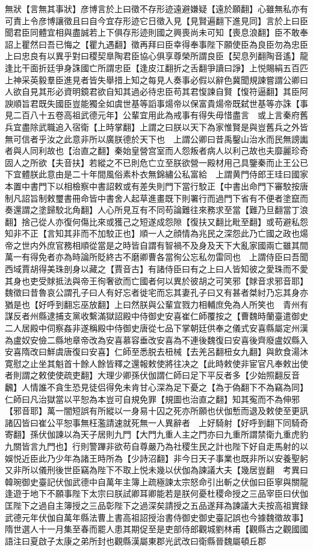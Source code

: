 無狀【言無其事狀】彦博言於上曰徵不存形迹遠避嫌疑【遠於願翻】心雖無私亦有可責上令彦博讓徵且曰自今宜存形迹它日徵入見【見賢遍翻下進見同】言於上曰臣聞君臣同體宜相與盡誠若上下俱存形迹則國之興喪尚未可知【喪息浪翻】臣不敢奉詔上瞿然曰吾已悔之【瞿九遇翻】徵再拜曰臣幸得奉事陛下願使臣為良臣勿為忠臣上曰忠良有以異乎對曰稷契臯陶君臣協心俱享尊榮所謂良臣【契息列翻陶音遙】龍逢比干面折廷爭身誅國亡所謂忠臣【逢皮江翻折之舌翻爭讀曰諍】上悦賜絹五百匹上神采英毅羣臣進見者皆失舉措上知之每見人奏事必假以辭色冀聞規諫嘗謂公卿曰人欲自見其形必資明鏡君欲自知其過必待忠臣苟其君愎諫自賢【愎符逼翻】其臣阿諛順旨君既失國臣豈能獨全如虞世基等謟事煬帝以保富貴煬帝既弑世基等亦誅【事見二百八十五卷高祖武德元年】公輩宜用此為戒事有得失毋惜盡言　或上言秦府舊兵宜盡除武職追入宿衛【上時掌翻】上謂之曰朕以天下為家惟賢是與豈舊兵之外皆無可信者乎汝之此意非所以廣朕德於天下也　上謂公卿曰昔禹鑿山治水而民無謗讟者與人同利故也【治直之翻】秦始皇營宫室而人怨叛者病人以利己故也夫靡麗珍奇固人之所欲【夫音扶】若縱之不已則危亡立至朕欲營一殿材用己具鑒秦而止王公已下宜體朕此意由是二十年間風俗素朴衣無錦繡公私富給　上謂黄門侍郎王珪曰國家本置中書門下以相檢察中書詔敕或有差失則門下當行駮正【中書出命門下審駮按唐制凡詔旨制敕璽書冊命皆中書舍人起草進畫既下則署行而過門下省有不便者塗竄而奏還謂之塗歸駮北角翻】人心所見互有不同苟論難往來務求至當【難乃旦翻當丁浪翻】捨己從人亦復何傷比來或獲己之短遂成怨隙【復扶又翻比毗至翻】或苟避私怨知非不正【言知其非而不加駮正也】順一人之顔情為兆民之深怨此乃亡國之政也煬帝之世内外庶官務相順從當是之時皆自謂有智禍不及身及天下大亂家國兩亡雖其間萬一有得免者亦為時論所貶終古不磨卿曹各當徇公忘私勿雷同也　上謂侍臣曰吾聞西域賈胡得美珠剖身以藏之【賈音古】有諸侍臣曰有之上曰人皆知彼之愛珠而不愛其身也吏受賕抵法與帝王徇奢欲而亡國者何以異於彼胡之可笑邪【賕音求邪音耶】魏徵曰昔魯哀公謂孔子曰人有好忘者徙宅而忘其妻孔子曰又有甚者桀紂乃忘其身亦猶是也【好呼到翻忘巫放翻】上曰然朕與公輩宜戮力相輔庶免為人所笑也　青州有謀反者州縣逮捕支黨收繫滿獄詔殿中侍御史安喜崔仁師覆按之【曹魏時蘭臺遣御史二人居殿中伺察姦非遂稱殿中侍御史唐從七品下掌朝廷供奉之儀式安喜縣屬定州漢為盧奴安儉二縣地章帝改為安喜慕容垂改安喜為不連後魏復曰安喜後齊廢盧奴縣入安喜隋改曰鮮虞唐復曰安喜】仁師至悉脱去杻械【去羌呂翻杻女九翻】與飲食湯沐寛慰之止坐其魁首十餘人餘皆釋之還報敕使將往决之【此時敕使非宦官凡奉敕出使者則謂之敕使使疏吏翻】大理少卿孫伏伽謂仁師曰足下平反者多【少始照翻反音飜】人情誰不貪生恐見徒侣得免未肯甘心深為足下憂之【為于偽翻下不為竊為同】仁師曰凡治獄當以平恕為本豈可自規免罪【規圖也治直之翻】知其寃而不為伸邪【邪音耶】萬一闇短誤有所縱以一身易十囚之死亦所願也伏伽慙而退及敕使至更訊諸囚皆曰崔公平恕事無枉濫請速就死無一人異辭者　上好騎射【好呼到翻下同騎奇寄翻】孫伏伽諫以為天子居則九門【大門九重人主之門亦曰九重所謂禁衛九重虎豹九關皆言九門也】行則警蹕非欲苟自尊嚴乃為社稷生民之計也陛下好自走馬射的以娛悦近臣此乃少年為諸王時所為【少詩沼翻】非今日天子事業也既非所以安養聖躬又非所以儀刑後世臣竊為陛下不取上悦未幾以伏伽為諫議大夫【幾居豈翻　考異曰韓琬御史臺記伏伽武德中自萬年主簿上疏極諫太宗怒命引出斬之伏伽曰臣寧與關龍逢遊于地下不願事陛下太宗曰朕試卿耳卿能若是朕何憂杜稷命授之三品宰臣曰伏伽匡陛下之過自主簿授之三品彰陛下之過深矣請授之五品遂拜為諫議大夫按高祖實録武德元年伏伽自萬年縣法曹上書高祖詔授治書侍御史御史臺記誤也今據魏徵故事】　隋世選人十一月集至春而罷人患其期促至是吏部侍郎觀城劉林甫【觀縣古之觀國國語注曰夏啟子太康之弟所封也觀縣漢屬東郡光武改曰衛縣晉魏屬頓丘郡
